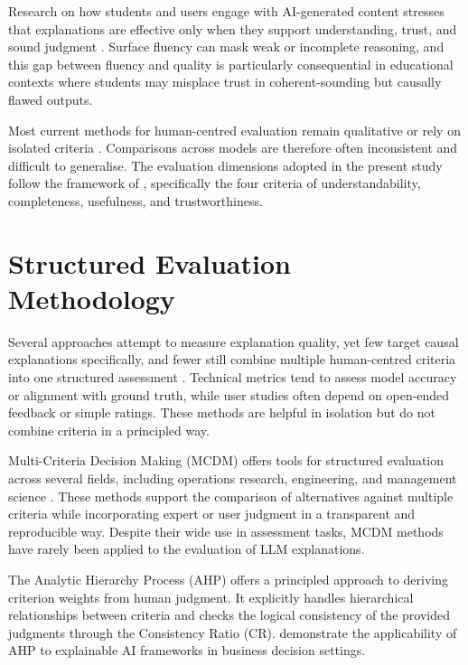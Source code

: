 Research on how students and users engage with AI-generated content stresses that
explanations are effective only when they support understanding, trust, and sound
judgment \citep{ehsan2021expanding}. Surface fluency can mask weak or incomplete
reasoning, and this gap between fluency and quality is particularly consequential in
educational contexts where students may misplace trust in coherent-sounding but
causally flawed outputs.

Most current methods for human-centred evaluation remain qualitative or rely on
isolated criteria \citep{boydgraber2022human}. Comparisons across models are
therefore often inconsistent and difficult to generalise. The evaluation dimensions
adopted in the present study follow the framework of \citet{hoffman2019metrics},
specifically the four criteria of understandability, completeness, usefulness, and
trustworthiness.

\section{Structured Evaluation Methodology}
\label{sec:lit-mcdm}

Several approaches attempt to measure explanation quality, yet few target causal
explanations specifically, and fewer still combine multiple human-centred criteria
into one structured assessment \citep{wang2025llm}. Technical metrics tend to assess
model accuracy or alignment with ground truth, while user studies often depend on
open-ended feedback or simple ratings. These methods are helpful in isolation but do
not combine criteria in a principled way.

Multi-Criteria Decision Making (MCDM) offers tools for structured evaluation across
several fields, including operations research, engineering, and management science
\citep{mardani2015multiple}. These methods support the comparison of alternatives
against multiple criteria while incorporating expert or user judgment in a
transparent and reproducible way. Despite their wide use in assessment tasks, MCDM
methods have rarely been applied to the evaluation of LLM explanations.

The Analytic Hierarchy Process (AHP) \citep{saaty1987ahp} offers a principled
approach to deriving criterion weights from human judgment. It explicitly handles
hierarchical relationships between criteria and checks the logical consistency of
the provided judgments through the Consistency Ratio (CR). \citet{diaz2025ahp}
demonstrate the applicability of AHP to explainable AI frameworks in business
decision settings.


